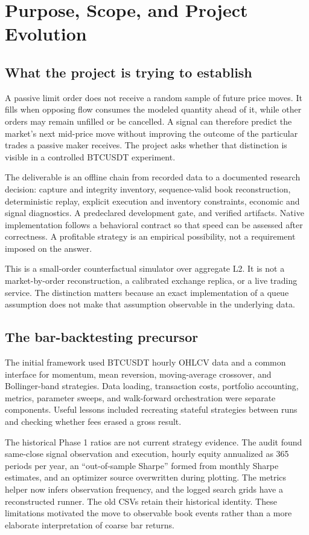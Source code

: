 \section{Purpose, Scope, and Project Evolution}

\subsection{What the project is trying to establish}

A passive limit order does not receive a random sample of future price moves.
It fills when opposing flow consumes the modeled quantity ahead of it, while
other orders may remain unfilled or be cancelled. A signal can therefore
predict the market's next mid-price move without improving the outcome of the
particular trades a passive maker receives. The project asks whether that
distinction is visible in a controlled BTCUSDT experiment.

The deliverable is an offline chain from recorded data to a documented research
decision: capture and integrity inventory, sequence-valid book reconstruction,
deterministic replay, explicit execution and inventory constraints, economic
and signal diagnostics. A predeclared development gate, and verified artifacts.
Native implementation follows a behavioral contract so that speed can be
assessed after correctness. A profitable strategy is an empirical possibility,
not a requirement imposed on the answer.

This is a small-order counterfactual simulator over aggregate L2. It is not a
market-by-order reconstruction, a calibrated exchange replica, or a live
trading service. The distinction matters because an exact implementation of a
queue assumption does not make that assumption observable in the underlying
data.

\subsection{The bar-backtesting precursor}

The initial framework used BTCUSDT hourly OHLCV data and a common interface for
momentum, mean reversion, moving-average crossover, and Bollinger-band
strategies. Data loading, transaction costs, portfolio accounting, metrics,
parameter sweeps, and walk-forward orchestration were separate components.
Useful lessons included recreating stateful strategies between runs and
checking whether fees erased a gross result.

The historical Phase 1 ratios are not current strategy evidence. The audit
found same-close signal observation and execution, hourly equity annualized as
365 periods per year, an ``out-of-sample Sharpe'' formed from monthly Sharpe
estimates, and an optimizer source overwritten during plotting. The metrics
helper now infers observation frequency, and the logged search grids have a
reconstructed runner. The old CSVs retain their historical identity. These
limitations motivated the move to observable book events rather than a more
elaborate interpretation of coarse bar returns.

